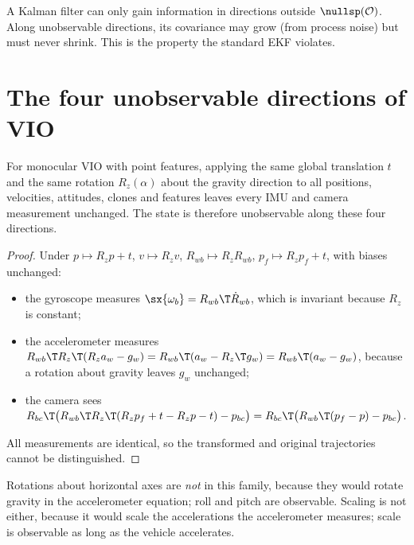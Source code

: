 A Kalman filter can only gain information in directions outside $\nullsp(\mathcal{O})$. Along unobservable directions, its
covariance may grow (from process noise) but must never shrink. This is the property the standard EKF violates.

\section{The four unobservable directions of VIO}

\begin{theorem}
\label{thm:vio-unobservable}
For monocular VIO with point features, applying the same global translation $t$ and the same rotation $R_z(\alpha)$ about the
gravity direction to all positions, velocities, attitudes, clones and features leaves every IMU and camera measurement
unchanged. The state is therefore unobservable along these four directions.
\end{theorem}
\begin{proof}
Under $p \mapsto R_zp + t$, $v \mapsto R_zv$, $R_{wb} \mapsto R_zR_{wb}$, $p_f \mapsto R_zp_f + t$, with biases unchanged:
\begin{itemize}
  \item the gyroscope measures $\sx{\omega_b} = R_{wb}\T\dot R_{wb}$, which is invariant because $R_z$ is constant;
  \item the accelerometer measures $R_{wb}\T R_z\T(R_za_w - g_w) = R_{wb}\T(a_w - R_z\T g_w) = R_{wb}\T(a_w - g_w)$, because a rotation about
        gravity leaves $g_w$ unchanged;
  \item the camera sees $R_{bc}\T\big(R_{wb}\T R_z\T(R_zp_f + t - R_zp - t) - p_{bc}\big) = R_{bc}\T\big(R_{wb}\T(p_f - p) - p_{bc}\big)$.
\end{itemize}
All measurements are identical, so the transformed and original trajectories cannot be distinguished.
\end{proof}

Rotations about horizontal axes are \emph{not} in this family, because they would rotate gravity in the accelerometer equation;
roll and pitch are observable. Scaling is not either, because it would scale the accelerations the accelerometer measures;
scale is observable as long as the vehicle accelerates.

